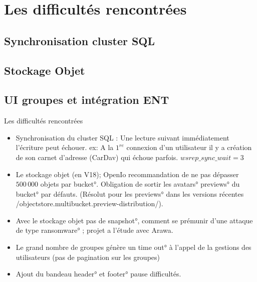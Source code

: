 
\section{Les difficultés rencontrées}
\subsection{Synchronisation cluster SQL}
\subsection{Stockage Objet}
\subsection{UI groupes et intégration ENT}
\begin{frame}[fragile]{Les difficultés rencontrées}

\begin{itemize}
	\item Synchronisation du cluster SQL : Une lecture suivant immédiatement l'écriture peut échouer.  
	ex: A la $1^{re}$ connexion d'un utilisateur il y a création de son carnet d'adresse (CarDav) qui échoue parfois.
		$wsrep\_sync\_wait = 3$
\end{itemize}
\begin{itemize}

\item Le stockage objet (en \small{V18});  OpenIo recommandation de ne pas dépasser $500\,000$ objets par \ang{bucket}. Obligation de sortir les \ang{avatars} \ang{previews} du \ang{bucket} par défauts. (Résolut pour les \ang{previews} dans les versions récentes \code/objectstore.multibucket.preview-distribution/).

\item Avec le stockage objet pas de \ang{snapshot}, comment se prémunir d'une attaque de type \ang{ransomware} ; projet a l'étude avec Arawa. 

\end{itemize}


\begin{itemize}
 \item Le grand nombre de groupes génère un \ang{time out} à l'appel de la gestions des utilisateurs (pas de pagination sur les groupes)
 \item Ajout du bandeau \ang{header} et \ang{footer} pause difficultés. 
\end{itemize}

\end{frame}
